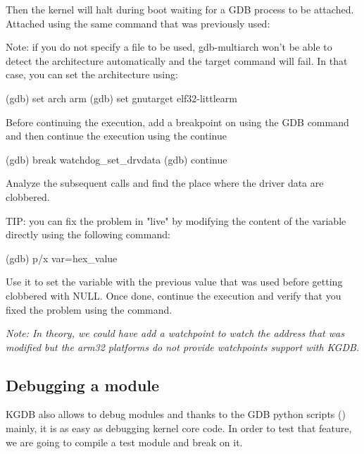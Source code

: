 Then the kernel will halt during boot waiting for a GDB process to be attached.
Attached using the same command that was previously used:


Note: if you do not specify a file to be used, gdb-multiarch won't be able to
detect the architecture automatically and the target command will fail. In that
case, you can set the architecture using:

\begin{bashinput}
(gdb) set arch arm
(gdb) set gnutarget elf32-littlearm
\end{bashinput}

Before continuing the execution, add a breakpoint on
 using the  GDB command and then
continue the execution using the continue 

\begin{bashinput}
(gdb) break watchdog_set_drvdata
(gdb) continue
\end{bashinput}

Analyze the subsequent calls and find the place where the driver data are
clobbered.

TIP: you can fix the problem in "live" by modifying the content of the
 variable directly using the following command:

\begin{bashinput}
(gdb) p/x var=hex_value
\end{bashinput}

Use it to set the variable with the previous value that was used before getting
clobbered with NULL. Once done, continue the execution and verify that you fixed
the problem using the  command.

{\em Note: In theory, we could have add a watchpoint to watch the address that
was modified but the arm32 platforms do not provide watchpoints support with
KGDB.}

\subsection{Debugging a module}

KGDB also allows to debug modules and thanks to the GDB python scripts
() mainly, it is as easy as debugging kernel core code. In
order to test that feature, we are going to compile a test module and break on
it.

